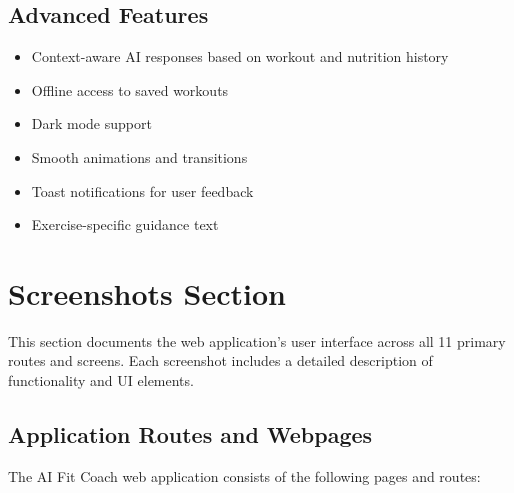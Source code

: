 \documentclass[12pt,a4paper]{article}
\begin{document}
\subsection{Advanced Features}

\begin{itemize}[noitemsep, topsep=2pt]
  \item Context-aware AI responses based on workout and nutrition history
  \item Offline access to saved workouts
  \item Dark mode support
  \item Smooth animations and transitions
  \item Toast notifications for user feedback
  \item Exercise-specific guidance text
\end{itemize}

\section{Screenshots Section}

This section documents the web application's user interface across all 11 primary routes 
and screens. Each screenshot includes a detailed description of functionality and UI elements.

\subsection{Application Routes and Webpages}

The AI Fit Coach web application consists of the following pages and routes:
\end{document}
